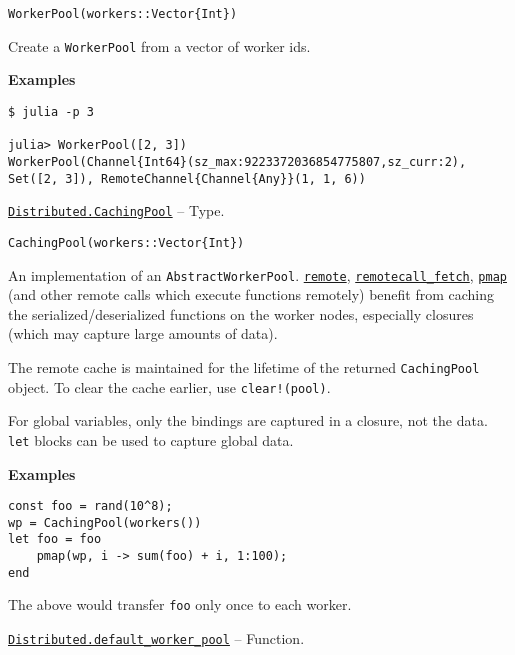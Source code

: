 \begin{adjustwidth}{2em}{0pt}


\begin{verbatim}
WorkerPool(workers::Vector{Int})
\end{verbatim}

Create a \texttt{WorkerPool} from a vector of worker ids.

\textbf{Examples}


\begin{verbatim}
$ julia -p 3

julia> WorkerPool([2, 3])
WorkerPool(Channel{Int64}(sz_max:9223372036854775807,sz_curr:2), Set([2, 3]), RemoteChannel{Channel{Any}}(1, 1, 6))
\end{verbatim}



\end{adjustwidth}
\hypertarget{8617353702639655725}{} 
\hyperlink{8617353702639655725}{\texttt{Distributed.CachingPool}}  -- {Type.}

\begin{adjustwidth}{2em}{0pt}


\begin{verbatim}
CachingPool(workers::Vector{Int})
\end{verbatim}

An implementation of an \texttt{AbstractWorkerPool}. \hyperlink{11837735656545549689}{\texttt{remote}}, \hyperlink{14909184572421937971}{\texttt{remotecall\_fetch}}, \hyperlink{9432281416771383761}{\texttt{pmap}} (and other remote calls which execute functions remotely) benefit from caching the serialized/deserialized functions on the worker nodes, especially closures (which may capture large amounts of data).

The remote cache is maintained for the lifetime of the returned \texttt{CachingPool} object. To clear the cache earlier, use \texttt{clear!(pool)}.

For global variables, only the bindings are captured in a closure, not the data. \texttt{let} blocks can be used to capture global data.

\textbf{Examples}


\begin{verbatim}
const foo = rand(10^8);
wp = CachingPool(workers())
let foo = foo
    pmap(wp, i -> sum(foo) + i, 1:100);
end
\end{verbatim}

The above would transfer \texttt{foo} only once to each worker.



\end{adjustwidth}
\hypertarget{994186287326037532}{} 
\hyperlink{994186287326037532}{\texttt{Distributed.default\_worker\_pool}}  -- {Function.}


